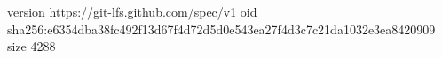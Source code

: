 version https://git-lfs.github.com/spec/v1
oid sha256:e6354dba38fc492f13d67f4d72d5d0e543ea27f4d3c7c21da1032e3ea8420909
size 4288
